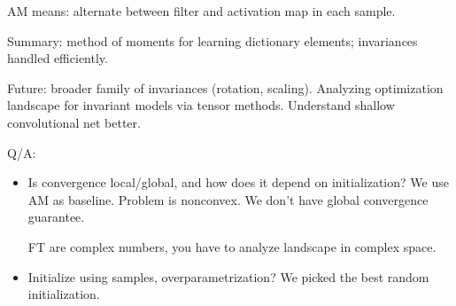AM means: alternate between filter and activation map in each sample.

Summary: method of moments for learning dictionary elements; invariances handled efficiently. 

Future: broader family of invariances (rotation, scaling). Analyzing optimization landscape for invariant models via tensor methods. Understand shallow convolutional net better.

Q/A:
\begin{itemize}
\item
Is convergence local/global, and how does it depend on initialization? We use AM as baseline. Problem is nonconvex.
We don't have global convergence guarantee.

FT are complex numbers, you have to analyze landscape in complex space. 
\item
Initialize using samples, overparametrization? We picked the best random initialization.
\end{itemize}


